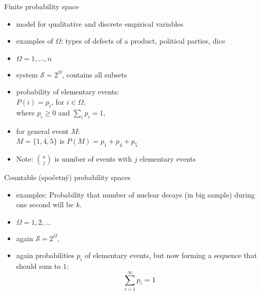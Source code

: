 \documentclass[smaller]{beamer}
\def\blue#1{{\usebeamercolor[fg]{my blue} #1}}
\def\cz#1{{\small (#1)}}
\begin{document}
\begin{frame}{Finite probability space}

\begin{itemize}
\item model for qualitative and discrete empirical variables\\
\item \blue{examples of $\Omega$:} types of defects of a product, political parties, dice
\item $\Omega={1, \dots ,n}$
\item system $\mathcal{S} = 2^\Omega$, contains all subsets
\item probability of elementary events:\\
      $P(i) = p_i$, for $i\in \Omega$,\\
      where $p_i\ge 0$  and $\sum_i p_i=1$, \\
\item for general event $M$:\\      
      $M = \{1,4,5\}$ is  $P(M) = p_1 + p_4 + p_5$    

\item Note: $\binom{n}{j}$ is number of events with $j$ elementary events\\
\end{itemize}
\end{frame}       

\begin{frame}{Countable \cz{spočetný} probability spaces}
\begin{itemize}
\item \blue{examples:} Probability that number of nuclear decays (in big sample) during one second will be $k$.
\item $\Omega = 1,2, \dots$\\
\item again $\mathcal{S} = 2^\Omega$,\\
\item again probabilities $p_i$ of elementary events, but now forming a sequence that should sum to $1$:\\
       \[
       \sum_{i=1}^\infty p_i = 1
       \]
\end{itemize}
\end{frame}
\end{document}
